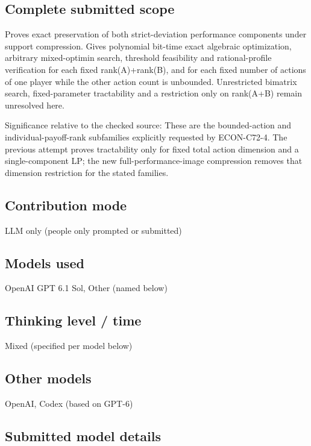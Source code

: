 \documentclass[11pt]{article}
\theoremstyle{remark}
\begin{document}
\subsection{Complete submitted scope}

Proves exact preservation of both strict-deviation performance components under support compression. Gives polynomial bit-time exact algebraic optimization, arbitrary mixed-optimin search, threshold feasibility and rational-profile verification for each fixed rank(A)+rank(B), and for each fixed number of actions of one player while the other action count is unbounded. Unrestricted bimatrix search, fixed-parameter tractability and a restriction only on rank(A+B) remain unresolved here.

Significance relative to the checked source: These are the bounded-action and individual-payoff-rank subfamilies explicitly requested by ECON-C72-4. The previous attempt proves tractability only for fixed total action dimension and a single-component LP; the new full-performance-image compression removes that dimension restriction for the stated families.

\subsection{Contribution mode}

LLM only (people only prompted or submitted)

\subsection{Models used}

OpenAI GPT 6.1 Sol, Other (named below)

\subsection{Thinking level / time}

Mixed (specified per model below)

\subsection{Other models}

OpenAI, Codex (based on GPT-6)

\subsection{Submitted model details}
\end{document}
